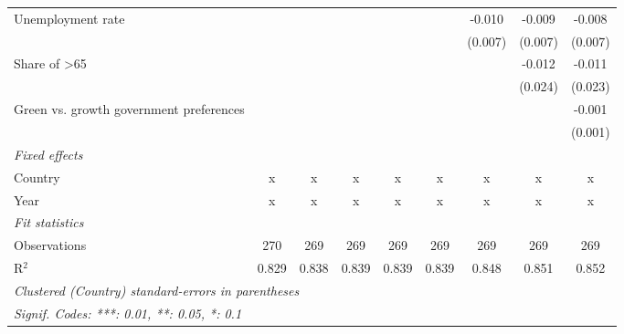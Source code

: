 \begin{table}[htbp]
\begin{tabular}{lcccccccc}
      Unemployment rate                                              &         &         &         &         &         & -0.010  & -0.009  & -0.008\\   
                                                                     &         &         &         &         &         & (0.007) & (0.007) & (0.007)\\   
      Share of >65                                                   &         &         &         &         &         &         & -0.012  & -0.011\\   
                                                                     &         &         &         &         &         &         & (0.024) & (0.023)\\   
      Green vs. growth government preferences                        &         &         &         &         &         &         &         & -0.001\\   
                                                                     &         &         &         &         &         &         &         & (0.001)\\   
      \emph{Fixed effects}\\
      Country                                                        & x       & x       & x       & x       & x       & x       & x       & x\\  
      Year                                                           & x       & x       & x       & x       & x       & x       & x       & x\\  
      \midrule \emph{Fit statistics}\\
      Observations                                                   & 270     & 269     & 269     & 269     & 269     & 269     & 269     & 269\\  
      R$^2$                                                          & 0.829   & 0.838   & 0.839   & 0.839   & 0.839   & 0.848   & 0.851   & 0.852\\  
      \midrule
      \multicolumn{9}{l}{\emph{Clustered (Country) standard-errors in parentheses}}\\
      \multicolumn{9}{l}{\emph{Signif. Codes: ***: 0.01, **: 0.05, *: 0.1}}\\
   \end{tabular}
\end{table}


